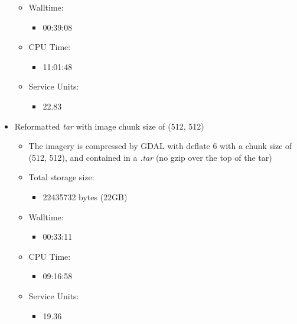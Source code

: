 \documentclass[a4paper]{article}
\begin{document}
\begin{itemize}
\begin{itemize}
\begin{itemize}
          \end{itemize}
        \item Walltime:
          \begin{itemize}
            \item 00:39:08
          \end{itemize}
        \item CPU Time:
          \begin{itemize}
            \item 11:01:48
          \end{itemize}
        \item Service Units:
          \begin{itemize}
            \item 22.83
          \end{itemize}
      \end{itemize}
      \item Reformatted \textit{tar} with image chunk size of (512, 512)
      \begin{itemize}
        \item The imagery is compressed by GDAL with deflate 6 with a chunk size of (512, 512), and contained in a \textit{.tar} (no gzip over the top of the tar)
        \item Total storage size:
          \begin{itemize}
            \item 22435732 bytes (22GB)
          \end{itemize}
        \item Walltime:
          \begin{itemize}
            \item 00:33:11
          \end{itemize}
        \item CPU Time:
          \begin{itemize}
            \item 09:16:58
          \end{itemize}
        \item Service Units:
          \begin{itemize}
            \item 19.36
          \end{itemize}
      \end{itemize}
    \end{itemize}

  \clearpage
\end{document}
